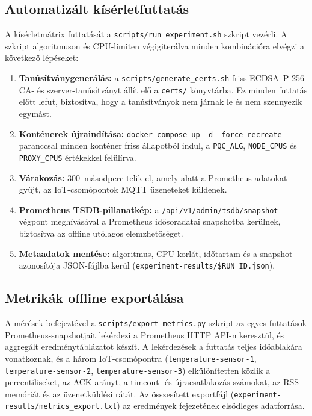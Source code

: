 \subsection{Automatizált kísérletfuttatás}

A kísérletmátrix futtatását a \texttt{scripts/run\_experiment.sh} szkript vezérli.
A szkript algoritmuson és CPU-limiten végigiterálva minden kombinációra elvégzi a
következő lépéseket:

\begin{enumerate}
    \item \textbf{Tanúsítványgenerálás:} a \texttt{scripts/generate\_certs.sh} friss
          ECDSA~P-256 CA- és szerver-tanúsítványt állít elő a \texttt{certs/} könyvtárba.
          Ez minden futtatás előtt lefut, biztosítva, hogy a tanúsítványok nem járnak le
          és nem szennyezik egymást.
    \item \textbf{Konténerek újraindítása:} \texttt{docker compose up -d --force-recreate}
          paranccsal minden konténer friss állapotból indul, a \texttt{PQC\_ALG},
          \texttt{NODE\_CPUS} és \texttt{PROXY\_CPUS} értékekkel felülírva.
    \item \textbf{Várakozás:} 300~másodperc telik el, amely alatt a Prometheus adatokat
          gyűjt, az IoT-csomópontok MQTT üzeneteket küldenek.
    \item \textbf{Prometheus TSDB-pillanatkép:} a \texttt{/api/v1/admin/tsdb/snapshot}
          végpont meghívásával a Prometheus idősoradatai snapshotba kerülnek, biztosítva
          az offline utólagos elemzhetőséget.
    \item \textbf{Metaadatok mentése:} algoritmus, CPU-korlát, időtartam és a snapshot
          azonosítója JSON-fájlba kerül (\texttt{experiment-results/\$RUN\_ID.json}).
\end{enumerate}

\subsection{Metrikák offline exportálása}

A mérések befejeztével a \texttt{scripts/export\_metrics.py} szkript az egyes futtatások
Prometheus-snapshotjait lekérdezi a Prometheus HTTP API-n keresztül, és aggregált
eredménytáblázatot készít. A lekérdezések a futtatás teljes időablakára vonatkoznak,
és a három IoT-csomópontra (\texttt{temperature-sensor-1}, \texttt{temperature-sensor-2},
\texttt{temperature-sensor-3}) elkülönítetten közlik a percentiliseket, az ACK-arányt,
a timeout- és újracsatlakozás-számokat, az RSS-memóriát és az üzenetküldési rátát.
Az összesített exportfájl (\texttt{experiment-results/metrics\_export.txt}) az
eredmények fejezetének elsődleges adatforrása.

